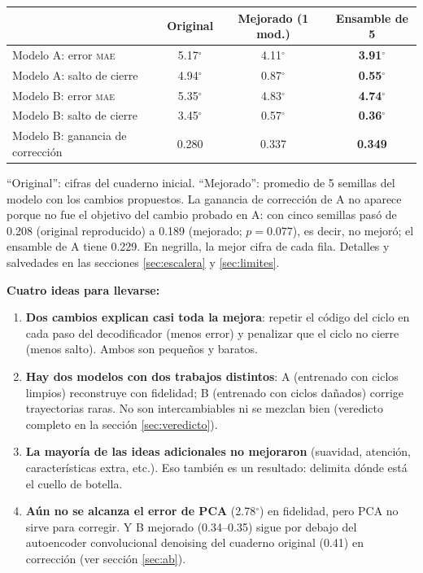 \documentclass[11pt,a4paper]{article}
\newcommand{\gr}{$^\circ$}
\newcommand{\mae}{\textsc{mae}}
\begin{document}
\begin{center}
\begin{tabular}{lccc}
\toprule
 & \textbf{Original} & \textbf{Mejorado (1 mod.)} & \textbf{Ensamble de 5} \\
\midrule
Modelo A: error \mae{} & 5.17\gr & 4.11\gr & \textbf{3.91\gr} \\
Modelo A: salto de cierre & 4.94\gr & 0.87\gr & \textbf{0.55\gr} \\[3pt]
Modelo B: error \mae{} & 5.35\gr & 4.83\gr & \textbf{4.74\gr} \\
Modelo B: salto de cierre & 3.45\gr & 0.57\gr & \textbf{0.36\gr} \\
Modelo B: ganancia de corrección & 0.280 & 0.337 & \textbf{0.349} \\
\bottomrule
\end{tabular}
\end{center}
{\small ``Original'': cifras del cuaderno inicial. ``Mejorado'': promedio de 5 semillas del modelo con los cambios propuestos. La ganancia de corrección de A no aparece porque no fue el objetivo del cambio probado en A: con cinco semillas pasó de 0.208 (original reproducido) a 0.189 (mejorado; $p=0.077$), es decir, no mejoró; el ensamble de A tiene 0.229. En negrilla, la mejor cifra de cada fila. Detalles y salvedades en las secciones \ref{sec:escalera} y \ref{sec:limites}.}

\textbf{Cuatro ideas para llevarse:}
\begin{enumerate}
\item \textbf{Dos cambios explican casi toda la mejora}: repetir el código del ciclo en cada paso del decodificador (menos error) y penalizar que el ciclo no cierre (menos salto). Ambos son pequeños y baratos.
\item \textbf{Hay dos modelos con dos trabajos distintos}: A (entrenado con ciclos limpios) reconstruye con fidelidad; B (entrenado con ciclos dañados) corrige trayectorias raras. No son intercambiables ni se mezclan bien (veredicto completo en la sección \ref{sec:veredicto}).
\item \textbf{La mayoría de las ideas adicionales no mejoraron} (suavidad, atención, características extra, etc.). Eso también es un resultado: delimita dónde está el cuello de botella.
\item \textbf{Aún no se alcanza el error de PCA} (2.78\gr) en fidelidad, pero PCA no sirve para corregir. Y B mejorado (0.34--0.35) sigue por debajo del autoencoder convolucional denoising del cuaderno original (0.41) en corrección (ver sección \ref{sec:ab}).
\end{enumerate}
\end{document}
